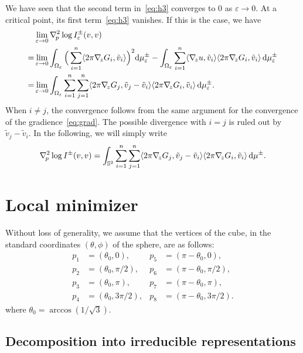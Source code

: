\documentclass[a4paper]{amsart}
\newcommand{\uS}{\mathbb{S}}
\newcommand{\Hess}{\nabla^2}
\newcommand{\dd}{{\rm d}}
\theoremstyle{plain} %
\theoremstyle{definition} %
\theoremstyle{remark}
\begin{document}
We have seen that the second term in~\eqref{eq:h3} converges to $0$ as
$\varepsilon \to 0$.  At a critical point, its first term~\eqref{eq:h3}
vanishes.  If this is the case, we have
\begin{align*}
	&\lim_{\varepsilon \to 0} \Hess_{\! p} \log I^\pm_\varepsilon (v, v) \\
	=&\lim_{\varepsilon \to 0}
	\int_{\Omega_\varepsilon} \Big( \sum_{i=1}^n \langle 2\pi \nabla_{\! z} G_i, \tilde v_i \rangle \Big)^2 \dd\mu_\varepsilon^\pm
	- \int_{\Omega_\varepsilon} \sum_{i=1}^n \langle \nabla_{\! z} u, \tilde v_i \rangle \langle 2\pi \nabla_{\! z} G_i, \tilde v_i \rangle \, \dd \mu_\varepsilon^\pm\\
	=&\lim_{\varepsilon \to 0}
	\int_{\Omega_\varepsilon} \sum_{i=1}^n \sum_{j=1}^n \langle 2\pi \nabla_{\! z} G_j, \tilde v_j - \tilde v_i \rangle \langle 2\pi \nabla_{\! z} G_i, \tilde v_i \rangle \, \dd \mu_\varepsilon^\pm.
\end{align*}
When $i \ne j$, the convergence follows from the same argument for the
convergence of the gradience~\eqref{eq:grad}.  The possible divergence with $i
= j$ is ruled out by $\tilde v_j - \tilde v_i$.  In the following, we will
simply write
\[
	\Hess_{\! p} \log I^\pm (v, v)
	=
	\int_{\uS^2} \sum_{i=1}^n \sum_{j=1}^n \langle 2\pi \nabla_{\! z} G_j, \tilde v_j - \tilde v_i \rangle \langle 2\pi \nabla_{\! z} G_i, \tilde v_i \rangle \, \dd \mu^\pm.
\]

\section{Local minimizer}

Without loss of generality, we assume that the vertices of the cube, in the
standard coordinates $(\theta, \phi)$ of the sphere, are as follows:
\begin{align*}
	p_1 &= (\theta_0, 0),&
	p_5 &= (\pi - \theta_0, 0),\\
	p_2 &= (\theta_0, \pi/2),&
	p_6 &= (\pi - \theta_0, \pi/2),\\
	p_3 &= (\theta_0, \pi),&
	p_7 &= (\pi - \theta_0, \pi),\\
	p_4 &= (\theta_0, 3\pi/2),&
	p_8 &= (\pi - \theta_0, 3\pi/2).
\end{align*}
where $\theta_0 = \arccos(1/\sqrt{3})$.

\subsection{Decomposition into irreducible representations}
\end{document}

